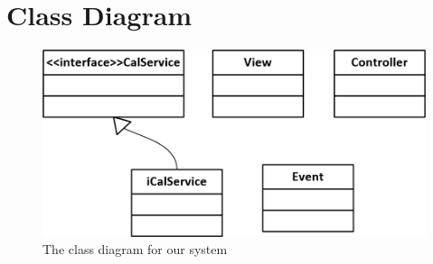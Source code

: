 \section{Class Diagram}
\begin{figure}[h!]
  \includegraphics[width=\textwidth,natwidth=948,natheight=464]{illustrations/classdiagram.png}
  \caption{The class diagram for our system}
\end{figure}
\newpage
